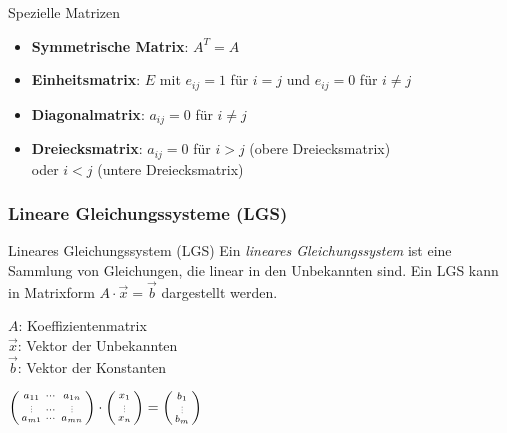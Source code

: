     \begin{KR}{Spezielle Matrizen}
        \begin{itemize}
            \item \textbf{Symmetrische Matrix}: $A^T = A$
            \item \textbf{Einheitsmatrix}: $E$ mit $e_{ij} = 1$ für $i = j$ und $e_{ij} = 0$ für $i \neq j$
            \item \textbf{Diagonalmatrix}: $a_{ij} = 0$ für $i \neq j$
            \item \textbf{Dreiecksmatrix}: $a_{ij} = 0$ für $i > j$ (obere Dreiecksmatrix) \\oder $i < j$ (untere Dreiecksmatrix)
        \end{itemize}
    \end{KR}

\subsubsection*{Lineare Gleichungssysteme (LGS)}
    
        \begin{definition}{Lineares Gleichungssystem (LGS)}
            Ein \textit{lineares Gleichungssystem} ist eine Sammlung von Gleichungen, 
            die linear in den Unbekannten sind. 
            Ein LGS kann in Matrixform $A\cdot\vec{x}=\vec{b}$ dargestellt werden.\\
            \begin{minipage}
                {0.45\linewidth}
                {\small
                $A$: Koeffizientenmatrix\\
                $\vec{x}$: Vektor der Unbekannten\\
                $\vec{b}$: Vektor der Konstanten}
            \end{minipage}
            \begin{minipage}{0.55\linewidth}
                $\begin{psmallmatrix} a_{11} & \cdots & a_{1n} \\ \scalebox{0.5}{\vdots} & \cdots & \scalebox{0.5}{\vdots} \\ a_{m1} & \cdots & a_{mn} \end{psmallmatrix} \cdot \begin{psmallmatrix}
                    x_1 \\ \scalebox{0.5}{\vdots} \\ x_n
                \end{psmallmatrix} = \begin{psmallmatrix}
                    b_1 \\ \scalebox{0.5}{\vdots} \\ b_m
                \end{psmallmatrix}$
            \end{minipage}
        \end{definition}

